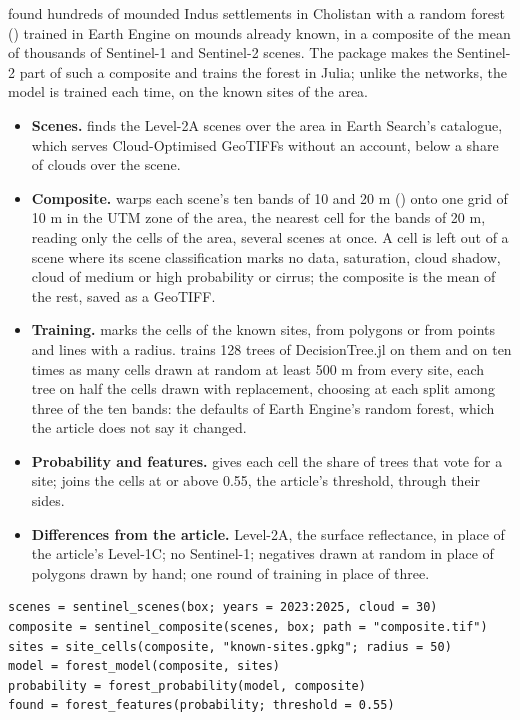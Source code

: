  found hundreds of mounded
Indus settlements in Cholistan with a random forest () trained in Earth Engine on
mounds already known, in a composite of the mean of thousands of Sentinel-1 and Sentinel-2 scenes. The package makes
the Sentinel-2 part of such a composite and trains the forest in Julia; unlike the networks, the model is trained
each time, on the known sites of the area.
\begin{itemize}
\item \textbf{Scenes.}  finds the Level-2A scenes over the area in Earth Search's catalogue,
  which serves Cloud-Optimised GeoTIFFs without an account, below a share of clouds over the scene.
\item \textbf{Composite.}  warps each scene's ten bands of 10 and 20 m () onto one grid of 10 m in the UTM zone of the area, the nearest cell for the bands of 20 m,
  reading only the cells of the area, several scenes at once. A cell is left out of a scene where its scene
  classification marks no data, saturation, cloud shadow, cloud of medium or high probability or cirrus; the
  composite is the mean of the rest, saved as a GeoTIFF.
\item \textbf{Training.}  marks the cells of the known sites, from polygons or from points and lines
  with a radius.  trains 128 trees of DecisionTree.jl on them and on ten times as many cells drawn
  at random at least 500 m from every site, each tree on half the cells drawn with replacement, choosing at each split
  among three of the ten bands: the defaults of Earth Engine's random forest, which the article does not say it
  changed.
\item \textbf{Probability and features.}  gives each cell the share of trees that vote for a
  site;  joins the cells at or above 0.55, the article's threshold, through their sides.
\item \textbf{Differences from the article.} Level-2A, the surface reflectance, in place of the article's Level-1C;
  no Sentinel-1; negatives drawn at random in place of polygons drawn by hand; one round of training in place of
  three.
\end{itemize}

{\small\begin{verbatim}
scenes = sentinel_scenes(box; years = 2023:2025, cloud = 30)
composite = sentinel_composite(scenes, box; path = "composite.tif")
sites = site_cells(composite, "known-sites.gpkg"; radius = 50)
model = forest_model(composite, sites)
probability = forest_probability(model, composite)
found = forest_features(probability; threshold = 0.55)
\end{verbatim}
}

